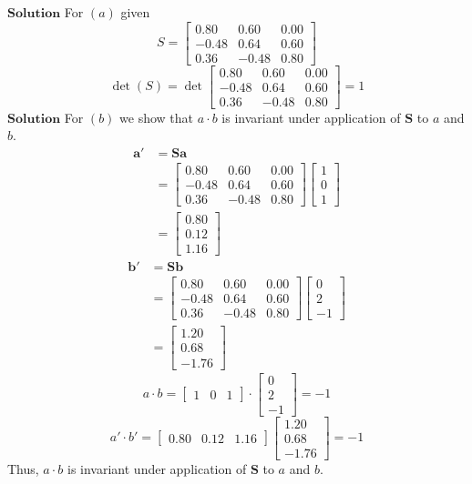 \documentclass{styles/kaobook}
\begin{document}
$\boxed{\textbf{Solution}}$ For $(a)$ given 
$$
S=\begin{bmatrix}
0.80 & 0.60 & 0.00 \\
-0.48 & 0.64 & 0.60 \\
0.36 & -0.48 & 0.80
\end{bmatrix}
$$
$$
\operatorname{det}(S)=\operatorname{det}\begin{bmatrix}
0.80 & 0.60 & 0.00 \\
-0.48 & 0.64 & 0.60 \\
0.36 & -0.48 & 0.80
\end{bmatrix}=1
$$
$\boxed{\textbf{Solution}}$ For $(b)$ we show that $a \cdot b$ is invariant under application of $\mathbf{S}$ to $a$ and $b$.
$$
\begin{aligned}
\mathbf{a}' &=\mathbf{S} \mathbf{a} \\
&=\begin{bmatrix}
0.80 & 0.60 & 0.00 \\
-0.48 & 0.64 & 0.60 \\
0.36 & -0.48 & 0.80
\end{bmatrix}\begin{bmatrix}
1 \\
0 \\
1
\end{bmatrix} \\
&=\begin{bmatrix}
0.80 \\
0.12 \\
1.16
\end{bmatrix}
\end{aligned}
$$
$$
\begin{aligned}
\mathbf{b}' &=\mathbf{S} \mathbf{b} \\
&=\begin{bmatrix}
0.80 & 0.60 & 0.00 \\
-0.48 & 0.64 & 0.60 \\
0.36 & -0.48 & 0.80
\end{bmatrix}\begin{bmatrix}
0 \\
2 \\
-1
\end{bmatrix} \\
&=\begin{bmatrix}
1.20 \\
0.68 \\
-1.76
\end{bmatrix}
\end{aligned}
$$
$$
a \cdot b=\begin{bmatrix}
1 & 0 & 1
\end{bmatrix} \cdot\begin{bmatrix}
0 \\
2 \\
-1
\end{bmatrix}=-1
$$
$$
a' \cdot b'=\begin{bmatrix}
0.80 & 0.12 & 1.16
\end{bmatrix}\begin{bmatrix}
1.20 \\
0.68 \\
-1.76
\end{bmatrix}=-1
$$
Thus, $a \cdot b$ is invariant under application of $\mathbf{S}$ to $a$ and $b$.
\end{document}
